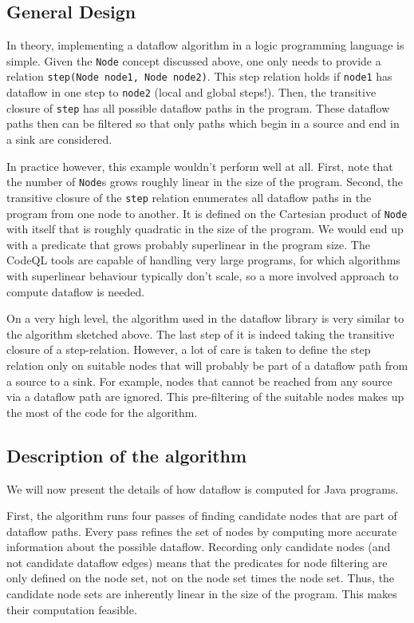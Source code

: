 \subsection{General Design}

In theory, implementing a dataflow algorithm in a logic programming language is simple.
Given the \texttt{Node} concept discussed above, one only needs to provide a relation
\texttt{step(Node node1, Node node2)}.
This step relation holds if \texttt{node1} has dataflow in one step to \texttt{node2}
(local and global steps!).
Then, the transitive closure of \texttt{step} has all possible dataflow paths in the program.
These dataflow paths then can be filtered so that only paths which begin in a source and 
end in a sink are considered.

In practice however, this example wouldn't perform well at all.
First, note that the number of \texttt{Node}s grows roughly linear in the size of
the program.
Second, the transitive closure of the \texttt{step} relation enumerates all dataflow
paths in the program from one node to another.
It is defined on the Cartesian product of \texttt{Node} with itself that is roughly quadratic 
in the size of the program.
We would end up with a predicate that grows probably superlinear in the program size.
The CodeQL tools are capable of handling very large programs,
for which algorithms with superlinear behaviour typically don't scale,
so a more involved approach to compute dataflow is needed.

On a very high level, the algorithm used in the dataflow library is very similar 
to the algorithm sketched above.
The last step of it is indeed taking the transitive closure of a step-relation.
However, a lot of care is taken to define the step relation only on suitable 
nodes that will probably be part of a dataflow path from a source to a sink.
For example, nodes that cannot be reached from any source via a dataflow path 
are ignored.
This pre-filtering of the suitable nodes makes up the most of the code for the 
algorithm.

\subsection{Description of the algorithm}
We will now present the details of how dataflow is computed for Java programs.

First, the algorithm runs four passes of finding candidate nodes that are part 
of dataflow paths.
Every pass refines the set of nodes by computing more accurate information about the 
possible dataflow.
Recording only candidate nodes (and not candidate dataflow edges) means that 
the predicates for node filtering are only defined on the node set,
not on the node set times the node set.
Thus, the candidate node sets are inherently linear in the size of the program.
This makes their computation feasible.

